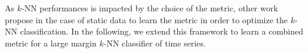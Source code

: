 As $k$-NN performances is impacted by the choice of the metric, other work propose in the case of static data to learn the metric in order to optimize the $k$-NN classification. In the following, we extend this framework to learn a combined metric for a large margin $k$-NN classifier of time series.







